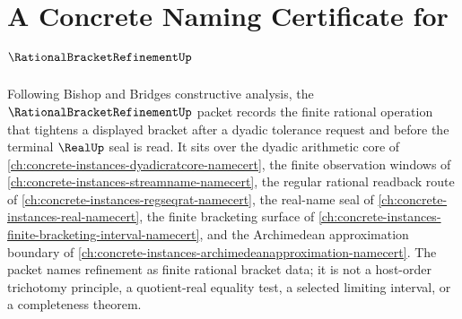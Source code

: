 \chapter{A Concrete Naming Certificate for $\RationalBracketRefinementUp$}
\label{ch:concrete-instances-rational-bracket-refinement-namecert}

Following Bishop and Bridges constructive analysis, the $\RationalBracketRefinementUp$ packet records the finite rational operation that tightens a displayed bracket after a dyadic tolerance request and before the terminal $\RealUp$ seal is read. It sits over the dyadic arithmetic core of \autoref{ch:concrete-instances-dyadicratcore-namecert}, the finite observation windows of \autoref{ch:concrete-instances-streamname-namecert}, the regular rational readback route of \autoref{ch:concrete-instances-regseqrat-namecert}, the real-name seal of \autoref{ch:concrete-instances-real-namecert}, the finite bracketing surface of \autoref{ch:concrete-instances-finite-bracketing-interval-namecert}, and the Archimedean approximation boundary of \autoref{ch:concrete-instances-archimedeanapproximation-namecert}. The packet names refinement as finite rational bracket data; it is not a host-order trichotomy principle, a quotient-real equality test, a selected limiting interval, or a completeness theorem.

